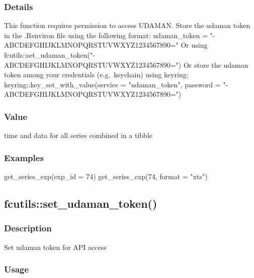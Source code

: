 \documentclass[
  letterpaper,
  DIV=11,
  numbers=noendperiod]{scrreport}
\newenvironment{Shaded}{\begin{snugshade}}{\end{snugshade}}
\newcommand{\AttributeTok}[1]{\textcolor[rgb]{0.40,0.45,0.13}{#1}}
\newcommand{\DecValTok}[1]{\textcolor[rgb]{0.68,0.00,0.00}{#1}}
\newcommand{\FunctionTok}[1]{\textcolor[rgb]{0.28,0.35,0.67}{#1}}
\newcommand{\NormalTok}[1]{\textcolor[rgb]{0.00,0.23,0.31}{#1}}
\newcommand{\StringTok}[1]{\textcolor[rgb]{0.13,0.47,0.30}{#1}}
\begin{document}
\subsubsection{Details}\label{details-1}

This function requires permission to access UDAMAN. Store the udaman
token in the .Renviron file using the following format: udaman\_token =
"-ABCDEFGHIJKLMNOPQRSTUVWXYZ1234567890=" Or using
fcutils::set\_udaman\_token("-ABCDEFGHIJKLMNOPQRSTUVWXYZ1234567890=") Or
store the udaman token among your credentials (e.g.~keychain) using
keyring: keyring::key\_set\_with\_value(service = "udaman\_token",
password = "-ABCDEFGHIJKLMNOPQRSTUVWXYZ1234567890=")

\subsubsection{Value}\label{value-1}

time and data for all series combined in a tibble

\subsubsection{Examples}\label{examples-1}

\begin{Shaded}
\begin{Highlighting}[]
\FunctionTok{get\_series\_exp}\NormalTok{(}\AttributeTok{exp\_id =} \DecValTok{74}\NormalTok{)}
\FunctionTok{get\_series\_exp}\NormalTok{(}\DecValTok{74}\NormalTok{, }\AttributeTok{format =} \StringTok{"xts"}\NormalTok{)}
\end{Highlighting}
\end{Shaded}

\subsection{fcutils::set\_udaman\_token()}\label{fcutilsset_udaman_token}

\subsubsection{Description}\label{description-2}

Set udaman token for API access

\subsubsection{Usage}\label{usage-2}
\end{document}

